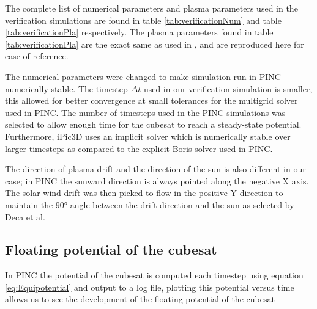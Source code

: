The complete list of numerical parameters and plasma parameters used in the verification simulations are found in table \ref{tab:verificationNum} and table \ref{tab:verificationPla} respectively. The plasma parameters found in table \ref{tab:verificationPla} are the exact same as used in \parencite{Deca2013}, and are reproduced here for ease of reference. 

The numerical parameters were changed to make simulation run in PINC numerically stable. The timestep $\Delta t$ used in our verification simulation is smaller, this allowed for better convergence at small tolerances for the multigrid solver used in PINC. The number of timesteps used in the PINC simulations was selected to allow enough time for the cubesat to reach a steady-state potential. Furthermore, iPic3D uses an implicit solver \parencite{Deca2013} which is numerically stable over larger timesteps as compared to the explicit Boris solver used in PINC. 

The direction of plasma drift and the direction of the sun is also different in our case; in PINC the sunward direction is always pointed along the negative X axis. The solar wind drift was then picked to flow in the positive Y direction to maintain the $\ang{90}$ angle between the drift direction and the sun as selected by Deca et al.

\subsection{Floating potential of the cubesat}

In PINC the potential of the cubesat is computed each timestep using equation \cref{eq:Equipotential} and output to a log file, plotting this potential versus time allows us to see the development of the floating potential of the cubesat

